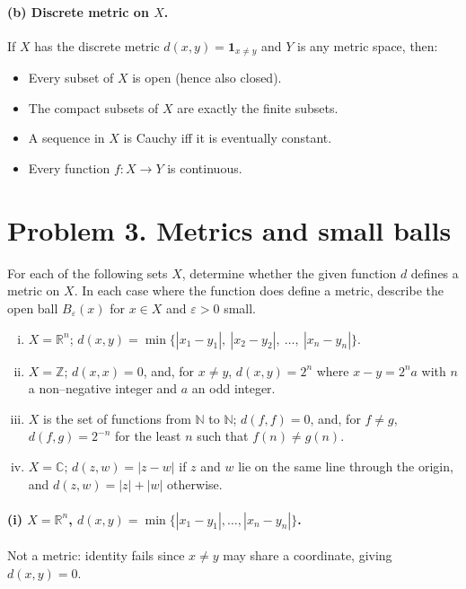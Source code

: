 \documentclass[12pt,a4paper]{article}
\theoremstyle{plain}
\theoremstyle{definition}
\theoremstyle{remark}
\theoremstyle{remark}
\begin{document}
\paragraph{(b) Discrete metric on $X$.}
If $X$ has the discrete metric $d(x,y)=\mathbf 1_{x\ne y}$ and $Y$ is any metric space, then:
\begin{itemize}
	\item Every subset of $X$ is open (hence also closed).
	\item The compact subsets of $X$ are exactly the finite subsets.
	\item A sequence in $X$ is Cauchy iff it is eventually constant.
	\item Every function $f:X\to Y$ is continuous.
\end{itemize}

\section*{Problem 3. Metrics and small balls}

For each of the following sets $X$, determine whether the given function $d$ defines a metric on $X$.
In each case where the function does define a metric, describe the open ball $B_\varepsilon(x)$
for $x\in X$ and $\varepsilon>0$ small.
\begin{enumerate}[(i)]
	\item $X=\mathbb{R}^n$; \quad $d(x,y)=\min\{|x_1-y_1|,\ |x_2-y_2|,\ \ldots,\ |x_n-y_n|\}$.
	\item $X=\mathbb{Z}$; \quad $d(x,x)=0$, and, for $x\neq y$, $d(x,y)=2^{n}$ where $x-y=2^{n}a$ with
	$n$ a non–negative integer and $a$ an odd integer.
	\item $X$ is the set of functions from $\mathbb{N}$ to $\mathbb{N}$; \quad $d(f,f)=0$, and, for $f\neq g$,
	$d(f,g)=2^{-n}$ for the least $n$ such that $f(n)\neq g(n)$.
	\item $X=\mathbb{C}$; \quad $d(z,w)=|z-w|$ if $z$ and $w$ lie on the same line through the origin,
	and $d(z,w)=|z|+|w|$ otherwise.
\end{enumerate}

\paragraph{(i) $X=\mathbb{R}^n$, $d(x,y)=\min\{|x_1-y_1|,\dots,|x_n-y_n|\}$.}
Not a metric: identity fails since $x\neq y$ may share a coordinate, giving $d(x,y)=0$.
\end{document}
